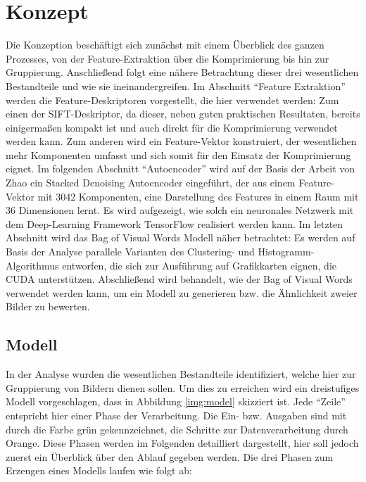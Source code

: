 \chapter{Konzept}

Die Konzeption beschäftigt sich zunächst mit einem Überblick des ganzen Prozesses, von der Feature-Extraktion über die Komprimierung bis hin zur Gruppierung. Anschließend folgt eine nähere Betrachtung dieser drei wesentlichen Bestandteile und wie sie ineinandergreifen.\newline
Im Abschnitt \enquote{Feature Extraktion} werden die Feature-Deskriptoren vorgestellt, die hier verwendet werden: Zum einen der SIFT-Deskriptor, da dieser, neben guten praktischen Resultaten, bereits einigermaßen kompakt ist und auch direkt für die Komprimierung verwendet werden kann. Zum anderen wird ein Feature-Vektor konstruiert, der wesentlichen mehr Komponenten umfasst und sich somit für den Einsatz der Komprimierung eignet.\newline
Im folgenden Abschnitt \enquote{Autoencoder} wird auf der Basis der Arbeit von Zhao \cite{aed2016} ein Stacked Denoising Autoencoder eingeführt, der aus einem Feature-Vektor mit 3042 Komponenten, eine Darstellung des Features in einem Raum mit 36 Dimensionen lernt. Es wird aufgezeigt, wie solch ein neuronales Netzwerk mit dem Deep-Learning Framework TensorFlow realisiert werden kann.\newline
Im letzten Abschnitt wird das Bag of Visual Words Modell näher betrachtet: Es werden auf Basis der Analyse parallele Varianten des Clustering- und Histogramm-Algorithmus entworfen, die sich zur Ausführung auf Grafikkarten eignen, die CUDA unterstützen. Abschließend wird behandelt, wie der Bag of Visual Words verwendet werden kann, um ein Modell zu generieren bzw. die Ähnlichkeit zweier Bilder zu bewerten.

\section{Modell}

In der Analyse wurden die wesentlichen Bestandteile identifiziert, welche hier zur Gruppierung von Bildern dienen sollen. Um dies zu erreichen wird ein dreistufiges Modell vorgeschlagen, dass in Abbildung \ref{img:model} skizziert ist. Jede \enquote{Zeile} entspricht hier einer Phase der Verarbeitung. Die Ein- bzw. Ausgaben sind mit durch die Farbe grün gekennzeichnet, die Schritte zur Datenverarbeitung durch Orange. Diese Phasen werden im Folgenden detailliert dargestellt, hier soll jedoch zuerst ein Überblick über den Ablauf gegeben werden. Die drei Phasen zum Erzeugen eines Modells laufen wie folgt ab:\newline 

